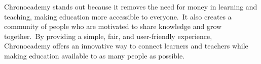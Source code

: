 Chronocademy stands out because it removes the need for money in learning and teaching, making education more accessible to everyone.\ It also creates a community of people who are motivated to share knowledge and grow together.\ By providing a simple, fair, and user-friendly experience, Chronocademy offers an innovative way to connect learners and teachers while making education available to as many people as possible.
